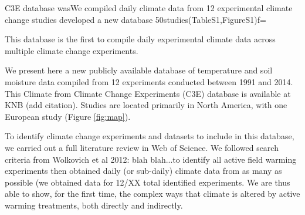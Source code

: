 \documentclass{article}
\begin{document}
C3E database wasWe compiled daily climate data from 12 experimental climate change studies developed a new database 50studies(TableS1,FigureS1)f=

This database is the first to compile daily experimental climate data across multiple climate change experiments.

\par We present here a new publicly  available database of temperature and soil moisture data compiled from 12 experiments conducted between 1991 and 2014. This Climate from Climate Change Experiments (C3E) database is available at KNB (add citation). Studies are located primarily in North America, with one European study (Figure \ref{fig:map}).

\par To identify climate change experiments and datasets to include in this database, we carried out a full literature review in Web of Science. We followed search criteria from Wolkovich et al 2012: blah blah...to identify all active field warming experiments then obtained daily (or sub-daily) climate data from as many as possible (we obtained data for 12/XX total identified experiments. We are thus able to show, for the first time, the complex ways that climate is altered by active warming treatments, both directly and indirectly. 



\end{document}
